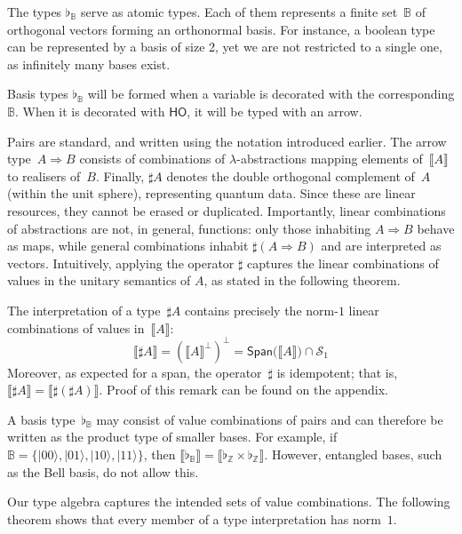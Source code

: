 \documentclass[a4paper,UKenglish,numberwithinsect,pdfa,anonymous]{lipics-v2021}
\theoremstyle{restatestyle}
\newcommand\ket[1]{\ensuremath{|#1\rangle}}
\newcommand\Span[1]{\ensuremath{{\mathsf{Span}}{#1}}}
\newcommand\AbsBasis{\ensuremath{\mathsf{H\!O}}}
\def\Sph{\mathcal{S}_1}       %
\def\BB{\mathbb{B}}
\def\Arr{\Rightarrow}
\def\sem#1{\llbracket#1\rrbracket}
\newcommand\B{\mathbb Z}
\newcommand\basis[1]{\ensuremath{\flat_{#1}}}
\begin{document}
The types $\basis{\BB}$ serve as atomic types. Each of them represents a finite
set~$\BB$ of orthogonal vectors forming an orthonormal basis. For instance, a
boolean type can be represented by a basis of size 2, yet we are not restricted
to a single one, as infinitely many bases exist. 

Basis types $\basis{\BB}$ will be formed when a variable is decorated with the
corresponding $\BB$. When it is decorated with $\AbsBasis$, it will be
typed with an arrow.

Pairs are standard, and written using the notation introduced earlier.
The arrow type~$A\Arr B$ consists of combinations of $\lambda$-abstractions
mapping elements of~$\sem{A}$ to realisers of~$B$.  
Finally, $\sharp A$ denotes the double orthogonal complement of~$A$ (within the unit sphere),
representing quantum data. Since these are linear resources, they cannot be erased or
duplicated.
Importantly, linear combinations of abstractions are not, in general, functions:
only those inhabiting $A \Arr B$ behave as maps, while general combinations
inhabit $\sharp(A \Arr B)$ and are interpreted as vectors.
Intuitively, applying the operator $\sharp$ captures the
linear combinations of values in the unitary semantics of $A$, as 
stated in the following theorem.

\begin{remark}\label{rem:SharpCharacterization}\label{rem:IdempotentSharp}
  The interpretation of a type~$\sharp A$ contains precisely the
  norm-$1$ linear combinations of values in~$\sem{A}$:
  \[
    \sem{\sharp A}
    = (\sem{A}^\bot)^\bot
    = \Span(\sem{A}) \cap \Sph
  \] 
  Moreover, as expected for a span, the operator~$\sharp$ is idempotent;
  that is, $\sem{\sharp A} = \sem{\sharp(\sharp A)}$. Proof of this
  remark can be found on the appendix.
\end{remark}

\begin{remark}
  A basis type~$\basis{\BB}$ may consist of value combinations of pairs and can
  therefore be written as the product type of smaller bases. For example, if
  $\BB=\{\ket{00},\ket{01},\ket{10},\ket{11}\}$, then $\sem{\basis{\BB}}=\sem{\basis{\B}\times\basis{\B}}$.
  However, entangled bases, such as the Bell basis, do not allow this.
\end{remark}

Our type algebra captures the intended sets of
value combinations. The following theorem shows that every member of a type
interpretation has norm~$1$.
\end{document}
